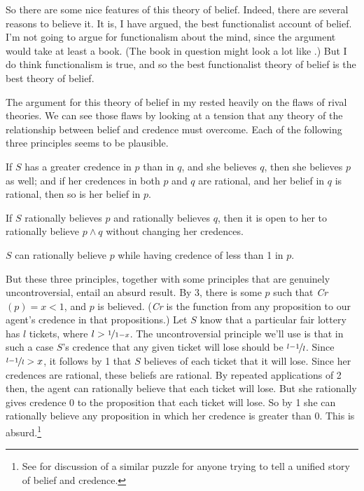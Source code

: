 \documentclass[11pt,oneside]{book}
\begin{document}
So there are some nice features of this theory of belief. Indeed, there are several reasons to believe it. It is, I have argued, the best functionalist account of belief. I'm not going to argue for functionalism about the mind, since the argument would take at least a book. (The book in question might look a lot like \cite{DBMJackson2007}.) But I do think functionalism is true, and so the best functionalist theory of belief is the best theory of belief.

The argument for this theory of belief in my  \citeyearpar{Weatherson2005-WEACWD} rested heavily on the flaws of rival theories. We can see those flaws by looking at a tension that any theory of the relationship between belief and credence must overcome. Each of the following three principles seems to be plausible.

\begin{enumerate*}
\item If $S$ has a greater credence in $p$ than in $q$, and she believes $q$, then she believes $p$ as well; and if her credences in both $p$ and $q$ are rational, and her belief in $q$ is rational, then so is her belief in $p$.
\item If $S$ rationally believes $p$ and rationally believes $q$, then it is open to her to rationally believe $p \wedge q$ without changing her credences.
\item $S$ can rationally believe $p$ while having credence of less than 1 in $p$.
\end{enumerate*}

\noindent But these three principles, together with some principles that are genuinely uncontroversial, entail an absurd result. By 3, there is some $p$ such that \textit{Cr}$(p) = x < 1$, and $p$ is believed. (\textit{Cr} is the function from any proposition to our agent's credence in that propositions.) Let $S$ know that a particular fair lottery has $l$ tickets, where $l > \nicefrac{1}{1-x}$. The uncontroversial principle we'll use is that in such a case $S$'s credence that any given ticket will lose should be $\nicefrac{l-1}{l}$. Since $\nicefrac{l-1}{l} > x$, it follows by 1 that $S$ believes of each ticket that it will lose. Since her credences are rational, these beliefs are rational. By repeated applications of 2 then, the agent can rationally believe that each ticket will lose. But she rationally gives credence 0 to the proposition that each ticket will lose. So by 1 she can rationally believe any proposition in which her credence is greater than 0. This is absurd.\footnote{See \cite{Sturgeon2008-STURAT} for discussion of a similar puzzle for anyone trying to tell a unified story of belief and credence.}
\end{document}
